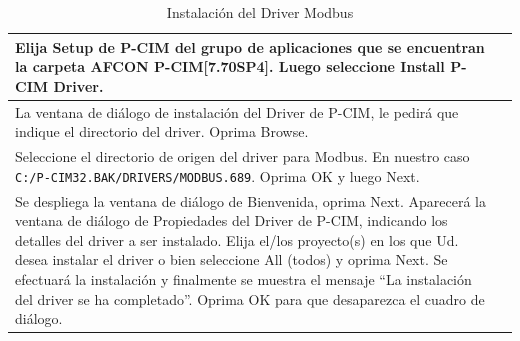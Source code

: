 \begin{table}[H]
\small
\centering
\renewcommand*{\arraystretch}{0.3}
\begin{tabular}{*{2}{m{}}}
\hline
  Elija Setup de P-CIM del grupo de aplicaciones que se encuentran la carpeta 
  AFCON P-CIM[7.70SP4]. Luego seleccione Install P-CIM Driver.
  &\begin{center}
    \rule{0.4\textwidth}{0.3\textwidth}
  \end{center}\\
\hline
  La ventana de diálogo de instalación del Driver de P-CIM, le pedirá que 
  indique el directorio del driver.
       Oprima Browse.
  &\begin{center}
    \rule{0.4\textwidth}{0.3\textwidth}
  \end{center}\\
\hline
  Seleccione el directorio de origen del driver para Modbus. En nuestro caso 
  \texttt{C:\slash P-CIM32.BAK\slash DRIVERS\slash MODBUS.689}. Oprima OK y 
luego Next.
  &\begin{center}
    \rule{0.4\textwidth}{0.3\textwidth}
  \end{center}\\
\hline
 Se despliega la ventana de diálogo de Bienvenida, oprima Next. 
 Aparecerá la ventana de diálogo de Propiedades del Driver de 
 P-CIM, indicando los detalles del driver a ser instalado.
 Elija el/los proyecto(s) en los que Ud. desea instalar el driver o bien 
 seleccione All (todos) y oprima Next.
 Se efectuará la instalación y finalmente se muestra el mensaje “La instalación 
 del driver se ha completado”. Oprima OK para que desaparezca el cuadro de 
 diálogo.
  &\begin{center}
    \rule{0.4\textwidth}{0.3\textwidth}
  \end{center}\\
\hline
\end{tabular}
\label{tab:installModbus}
\caption{Instalación del Driver Modbus}
\end{table}

